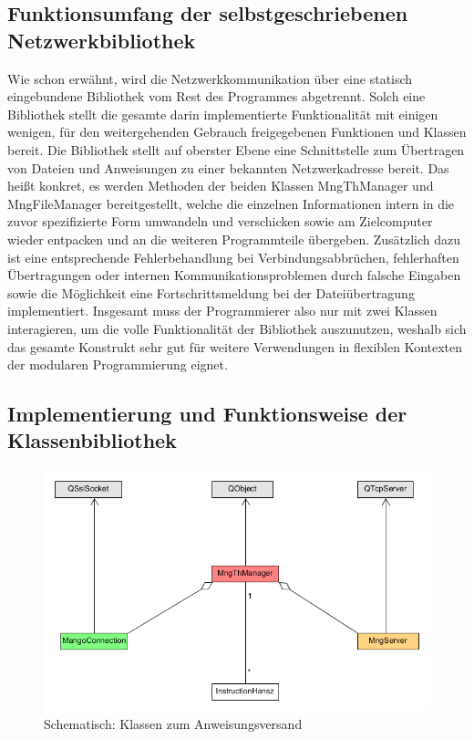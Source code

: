 \subsection{Funktionsumfang der selbstgeschriebenen Netzwerkbibliothek}
Wie schon erwähnt, wird die Netzwerkkommunikation über eine statisch eingebundene Bibliothek vom Rest des Programmes abgetrennt.
Solch eine Bibliothek stellt die gesamte darin implementierte Funktionalität mit einigen wenigen, für den weitergehenden Gebrauch freigegebenen Funktionen und Klassen bereit.
Die Bibliothek stellt auf oberster Ebene eine Schnittstelle zum Übertragen von Dateien und Anweisungen zu einer bekannten Netzwerkadresse bereit.
Das heißt konkret, es werden Methoden der beiden Klassen MngThManager und MngFileManager bereitgestellt, welche die einzelnen Informationen intern in die zuvor spezifizierte Form umwandeln und verschicken sowie am Zielcomputer wieder entpacken und an die weiteren Programmteile übergeben.
Zusätzlich dazu ist eine entsprechende Fehlerbehandlung bei Verbindungsabbrüchen, fehlerhaften Übertragungen oder internen Kommunikationsproblemen durch falsche Eingaben sowie die Möglichkeit eine Fortschrittsmeldung bei der Dateiübertragung implementiert.
Insgesamt muss der Programmierer also nur mit zwei Klassen interagieren, um die volle Funktionalität der Bibliothek auszunutzen, weshalb sich das gesamte Konstrukt sehr gut für weitere Verwendungen in flexiblen Kontexten der modularen Programmierung eignet.

\subsection{Implementierung und Funktionsweise der Klassenbibliothek}

\begin{figure}
\includegraphics[scale=.4]{classDiagInstr}
\caption{Schematisch: Klassen zum Anweisungsversand}
\label{inst_d}
\end{figure}

